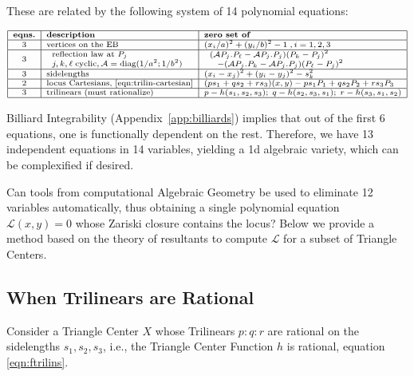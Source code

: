 These are related by the following system of 14 polynomial equations:

$$
\scriptsize
\begin{array}{|c|l|l|}
\hline
\textbf{eqns.} & \textbf{description} & \textbf{zero set of} \\
\hline
3 & \text{vertices on the EB} & (x_i/a)^2 + (y_i/b)^2 - 1\;,i = 1,2,3 \\
\hline
3 & \begin{array}{l} \text{reflection law at $P_j$} \\ j,k,\ell\;\text{cyclic}, \mathcal{A}=\text{diag}(1/a^2;1/b^2)\end{array} &
\begin{array}{l}
(\mathcal{A} P_j . P_{\ell}- \mathcal{A} P_j.P_j)(P_k-P_j)^2 \\
\;\;\;-(\mathcal{A} P_j . P_k -  \mathcal{A} P_j . P_j) (P_{\ell} - P_j )^2
\end{array} \\
\hline
3 & \text{sidelengths} & (x_i-x_j)^2 + (y_i-y_j)^2 -  s_k^2 \\
\hline
2 & \text{locus Cartesians, \eqref{eqn:trilin-cartesian}} & (p s_1 + q s_2 + r s_3) (x, y) - p s_1 P_1 + q s_2 P_2 + r s_3 P_3 \\
\hline
3 & \text{trilinears (must rationalize)} & p - h(s_1, s_2, s_3);\; q- h(s_2, s_3, s_1);\; r- h(s_3, s_1, s_2) \\
\hline
\end{array}
$$

Billiard Integrability (Appendix~\ref{app:billiards}) implies that out of the first 6 equations, one is functionally dependent on the rest. Therefore, we have 13 independent equations in 14 variables, yielding a 1d algebraic variety, which can be complexified if desired.

Can tools from computational Algebraic Geometry \cite{Schenck2003-GA,Sturmfels97-resultants} be used to eliminate 12 variables automatically, thus obtaining a single polynomial equation $\mathcal{L}(x,y)=0$ whose Zariski closure contains the locus? Below we provide a method based on the theory of resultants \cite{lang,Sturmfels97-resultants} to compute $\mathcal{L}$ for a subset of Triangle Centers.

\subsection{When Trilinears are Rational}
\label{sec:rational-trilinears}

Consider a Triangle Center $X$ whose Trilinears $p:q:r$ are rational on the sidelengths $s_1,s_2,s_3$, i.e., the Triangle Center Function $h$ is rational, equation \eqref{eqn:ftrilins}.

